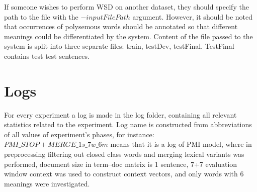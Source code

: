 If someone wishes to perform WSD on another dataset, they should specify the path to the file with the
$-inputFilePath$ argument. However, it should be noted that occurrences of polysemous words should
be annotated so that different meanings could be differentiated by the system. Content of the file
 passed to the system is split into three separate files: train, testDev, testFinal. TestFinal contains test
test sentences. 


\section{Logs}
For every experiment a log is made in the log folder, containing all relevant statistics related to the 
experiment. Log name is constructed from abbreviations of all values of experiment's phases, for instance: $PMI\_STOP+MERGE\_1s\_7w\_6m$ means that it is a log of PMI model, where in preprocessing
 filtering out closed class words and merging lexical variants was performed, document size in term--doc matrix is 1 sentence, 7+7 evaluation window context was used to construct context vectors, and only words with 6 meanings were investigated.